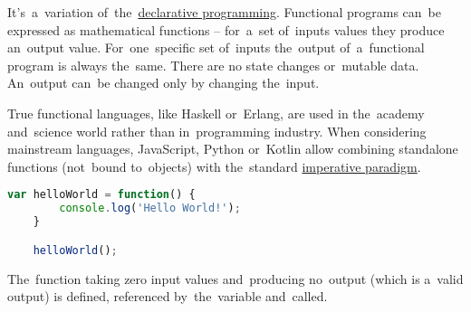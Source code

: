 \label{functionalprogramming}
It's~a~variation of~the~\hyperref[declarativeprogramming]{declarative programming}.
Functional programs can~be expressed as mathematical functions -- for~a~set of~inputs values they produce an~output value.
For~one~specific set of~inputs the~output of~a~functional program is always the~same.
There are no state changes or~mutable data.
An~output can~be changed only by changing the~input.

True functional languages, like Haskell or~Erlang, are used in the~academy and~science world rather than in~programming industry.
When considering mainstream languages, JavaScript, Python or~Kotlin allow combining standalone functions (not~bound to~objects) with the~standard \hyperref[imperativeprogramming]{imperative paradigm}.

\begin{lstlisting}[language=JavaScript]
    var helloWorld = function() {
        console.log('Hello World!');
    }

    helloWorld();
\end{lstlisting}

\noindent The~function taking zero input values and~producing no~output (which is a~valid output) is defined, referenced by~the~variable and~called.
